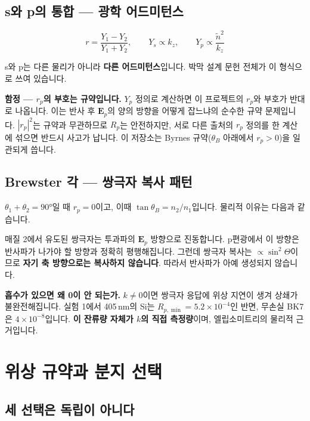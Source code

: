 \documentclass[10pt,a4paper]{article}
\newcommand{\note}[1]{%
  \begin{tcolorbox}[enhanced,breakable,colback=white,colframe=accent,
    boxrule=0pt,leftrule=1.6pt,arc=0pt,outer arc=0pt,
    left=6pt,right=2pt,top=3pt,bottom=3pt,boxsep=0pt,
    before skip=5pt, after skip=8pt]
  #1
  \end{tcolorbox}}
\newcommand{\nt}{\tilde n}
\begin{document}
\subsection{s와 p의 통합 — 광학 어드미턴스}

\begin{equation}
r = \frac{Y_1-Y_2}{Y_1+Y_2}, \qquad
Y_s \propto k_z, \qquad Y_p \propto \frac{\nt^2}{k_z}
\end{equation}

s와 p는 다른 물리가 아니라 \textbf{다른 어드미턴스}입니다. 박막 설계 문헌 전체가 이 형식으로 쓰여 있습니다.

\note{\textbf{함정 — $r_p$의 부호는 규약입니다.} $Y_p$ 정의로 계산하면 이 프로젝트의 $r_p$와 부호가 반대로 나옵니다. 이는 반사 후 $\mathbf{E}_p$의 양의 방향을 어떻게 잡느냐의 순수한 규약 문제입니다. $|r_p|^2$는 규약과 무관하므로 $R_p$는 안전하지만, 서로 다른 출처의 $r_p$ 정의를 한 계산에 섞으면 반드시 사고가 납니다. 이 저장소는 Byrnes 규약($\theta_B$ 아래에서 $r_p>0$)을 일관되게 씁니다.}

\subsection{Brewster 각 — 쌍극자 복사 패턴}

$\theta_1+\theta_2 = 90°$일 때 $r_p = 0$이고, 이때 $\tan\theta_B = n_2/n_1$입니다. 물리적 이유는 다음과 같습니다.

매질 2에서 유도된 쌍극자는 투과파의 $\mathbf{E}_p$ 방향으로 진동합니다. p편광에서 이 방향은 반사파가 나가야 할 방향과 정확히 평행해집니다. 그런데 쌍극자 복사는 $\propto\sin^2\Theta$이므로 \textbf{자기 축 방향으로는 복사하지 않습니다}. 따라서 반사파가 아예 생성되지 않습니다.

\note{\textbf{흡수가 있으면 왜 0이 안 되는가.} $k\neq0$이면 쌍극자 응답에 위상 지연이 생겨 상쇄가 불완전해집니다. 실험 1에서 405\,nm의 Si는 $R_{p,\min}=5.2\times10^{-4}$인 반면, 무손실 BK7은 $4\times10^{-8}$입니다. \textbf{이 잔류량 자체가 $k$의 직접 측정량}이며, 엘립소미트리의 물리적 근거입니다.}

\section{위상 규약과 분지 선택}

\subsection{세 선택은 독립이 아니다}
\end{document}

